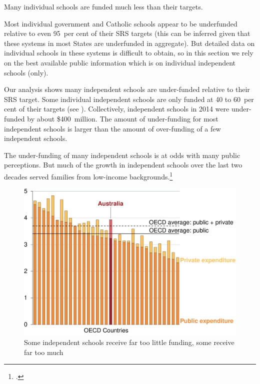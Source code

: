 \documentclass{grattan}
\begin{document}
Many individual schools are funded much less than their targets.

Most individual government and Catholic schools appear to be underfunded relative to even 95~per cent of their SRS targets (this can be inferred given that these systems in most States are underfunded in aggregate). But detailed data on individual schools in these systems is difficult to obtain, so in this section we rely on the best available public information which is on individual independent schools (only).

Our analysis shows many independent schools are under-funded relative to their SRS target. Some individual independent schools are only funded at 40 to 60~per cent of their targets (see ).
Collectively, independent schools in 2014 were under-funded by about \$400~million.
The amount of under-funding for most independent schools is larger than the amount of over-funding of a few independent schools.

The under-funding of many independent schools is at odds with many public perceptions. But much of the growth in independent schools over the last two decades served families from low-income backgrounds.\footcites{KingndTheStructureandFunding}{Buckingham2016OneSchoolDoes}

\begin{figure}
\caption{Some independent schools receive far too little funding, some receive far too much\label{fig:some-independent-schools-well-below-SRS-target}}


\includegraphics[page=3]{atlas/Charts.pdf}

\end{figure}
\end{document}
